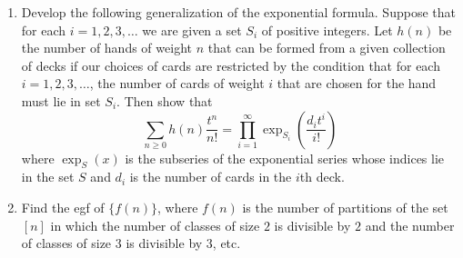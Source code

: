 \begin{exercise}
    \begin{enumerate}[label=(\alph*)]
        \item Develop the following generalization of the exponential formula. Suppose that for each $i=1,2,3,\ldots$ we are given a set $S_i$ of positive integers. Let $h(n)$ be the number of hands of weight $n$ that can be formed from a given collection of decks if our choices of cards are restricted by the condition that for each $i=1,2,3,\ldots$, the number of cards of weight $i$ that are chosen for the hand must lie in set $S_i$. Then show that
        \[
            \sum_{n\geq 0}h(n) \frac{t^n}{n!} = \prod_{i=1}^\infty \exp_{S_i}\left(\frac{d_it^i}{i!}\right)
        \]
        where $\exp_S(x)$ is the subseries of the exponential series whose indices lie in the set $S$ and $d_i$ is the number of cards in the $i$th deck.
        \item Find the egf of $\{f(n)\}$, where $f(n)$ is the number of partitions of the set $[n]$ in which the number of classes of size $2$ is divisible by $2$ and the number of classes of size $3$ is divisible by $3$, etc.
    \end{enumerate}
\end{exercise}
